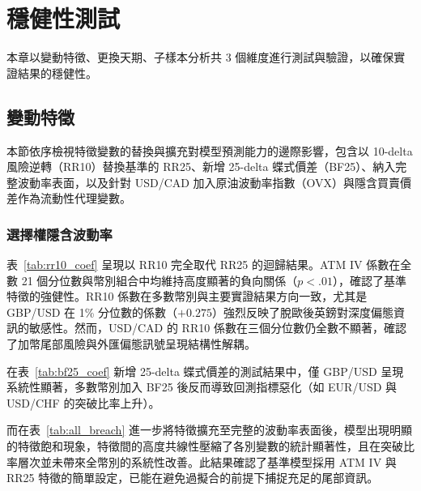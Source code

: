 \chapter{穩健性測試}
\label{chap:robustness}

本章以變動特徵、更換天期、子樣本分析共 3 個維度進行測試與驗證，以確保實證結果的穩健性。

\section{變動特徵}
\label{sec:r_feature}

本節依序檢視特徵變數的替換與擴充對模型預測能力的邊際影響，包含以 10-delta 風險逆轉（RR10）替換基準的 RR25、新增 25-delta 蝶式價差（BF25）、納入完整波動率表面，以及針對 USD/CAD 加入原油波動率指數（OVX）與隱含買賣價差作為流動性代理變數。

\subsection{選擇權隱含波動率}
\label{subsec:r1}

表~\ref{tab:rr10_coef} 呈現以 RR10 完全取代 RR25 的迴歸結果。ATM IV 係數在全數 21 個分位數與幣別組合中均維持高度顯著的負向關係（$p < .01$），確認了基準特徵的強健性。RR10 係數在多數幣別與主要實證結果方向一致，尤其是 GBP/USD 在 1\% 分位數的係數（$+0.275$）強烈反映了脫歐後英鎊對深度偏態資訊的敏感性。然而，USD/CAD 的 RR10 係數在三個分位數仍全數不顯著，確認了加幣尾部風險與外匯偏態訊號呈現結構性解耦。

在表~\ref{tab:bf25_coef} 新增 25-delta 蝶式價差的測試結果中，僅 GBP/USD 呈現系統性顯著，多數幣別加入 BF25 後反而導致回測指標惡化（如 EUR/USD 與 USD/CHF 的突破比率上升）。

而在表~\ref{tab:all_breach} 進一步將特徵擴充至完整的波動率表面後，模型出現明顯的特徵飽和現象，特徵間的高度共線性壓縮了各別變數的統計顯著性，且在突破比率層次並未帶來全幣別的系統性改善。此結果確認了基準模型採用 ATM IV 與 RR25 特徵的簡單設定，已能在避免過擬合的前提下捕捉充足的尾部資訊。


